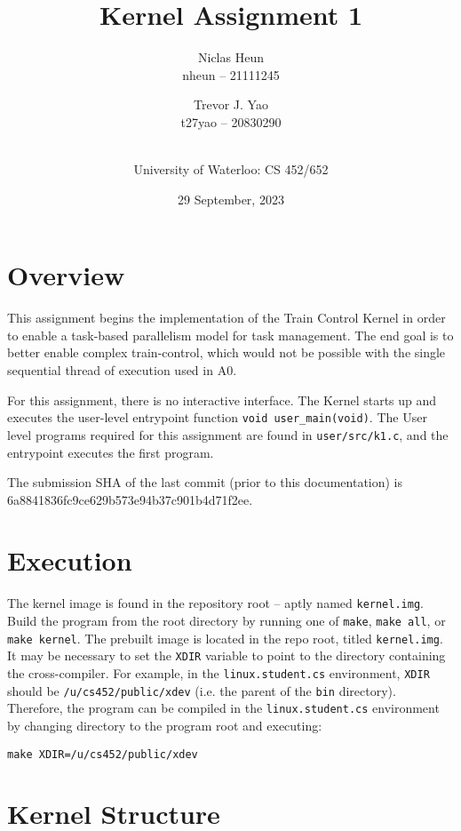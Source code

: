 \documentclass[12pt]{article}
\title{Kernel Assignment 1}
\author{Niclas Heun \\ nheun -- 21111245 \and Trevor J. Yao \\ t27yao -- 20830290 \and \\ University of Waterloo: CS 452/652}
\date{29 September, 2023}
\begin{document}
    \maketitle
    \pagestyle{fancy}
    
    \section{Overview}
    \label{sec:overview}
    
    This assignment begins the implementation of the Train Control Kernel in order to enable a task-based parallelism model for task management. The end goal is to better enable complex train-control, which would not be possible with the single sequential thread of execution used in A0.
    
    For this assignment, there is no interactive interface. The Kernel starts up and executes the user-level entrypoint function \verb`void user_main(void)`. The User level programs required for this assignment are found in \verb`user/src/k1.c`, and the entrypoint executes the first program.
    
    The submission SHA of the last commit (prior to this documentation) is  \\ 6a8841836fc9ce629b573e94b37c901b4d71f2ee.
    
    \section{Execution}
    
    The kernel image is found in the repository root -- aptly named \verb`kernel.img`. Build the program from the root directory by running one of \verb`make`, \verb`make all`, or \verb`make kernel`. The prebuilt image is located in the repo root, titled \verb`kernel.img`. It may be necessary to set the \verb`XDIR` variable to point to the directory containing the cross-compiler. For example, in the \verb`linux.student.cs` environment, \verb`XDIR` should be \verb`/u/cs452/public/xdev` (i.e. the parent of the \verb`bin` directory). Therefore, the program can be compiled in the \verb`linux.student.cs` environment by changing directory to the program root and executing:
    \begin{verbatim}
make XDIR=/u/cs452/public/xdev
    \end{verbatim}
    
    \section{Kernel Structure}
    
\end{document}
